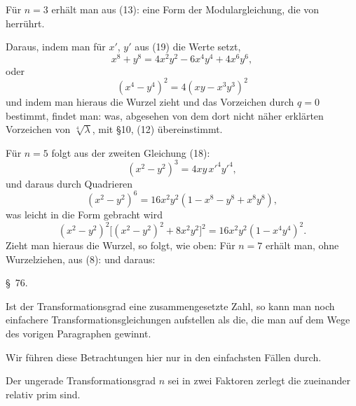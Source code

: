 Für $n=3$ erhält man aus (13):
eine Form der Modulargleichung, die von  herrührt.

Daraus, indem man für $x'$, $y'$ aus (19) die Werte setzt,
\[
x^8 + y^8 = 4x^2y^2 - 6x^4y^4 + 4x^6y^6,
\]
oder
\[
(x^4 - y^4)^2 = 4(xy - x^3y^3)^2
\]
und indem man hieraus die Wurzel zieht und das Vorzeichen
durch $q=0$ bestimmt, findet man:
was, abgesehen von dem dort nicht näher erklärten Vorzeichen
von $\sqrt[4]{\lambda}$, mit \S 10, (12) übereinstimmt.

Für $n=5$ folgt aus der zweiten Gleichung (18):
\[
(x^2 - y^2)^3 = 4xy\,x'^4y'^4,
\]
und daraus durch Quadrieren
\[
(x^2 - y^2)^6 = 16x^2y^2(1 - x^8 - y^8 + x^8y^8),
\]
was leicht in die Form gebracht wird
\[
(x^2 - y^2)^2\bigl[(x^2 - y^2)^2 + 8x^2y^2\bigr]^2 = 16x^2y^2(1 - x^4y^4)^2.
\]
Zieht man hieraus die Wurzel, so folgt, wie oben:
Für $n=7$ erhält man, ohne Wurzelziehen, aus (8):
und daraus:

\begin{center}
\S\ 76.\quad {}
\end{center}

Ist der Transformationsgrad eine zusammengesetzte Zahl, so
kann man noch einfachere Transformationsgleichungen aufstellen
als die, die man auf dem Wege des vorigen Paragraphen gewinnt.

Wir führen diese Betrachtungen hier nur in den einfachsten
Fällen durch.

Der ungerade Transformationsgrad $n$ sei in zwei Faktoren
zerlegt
die zueinander relativ prim sind.
